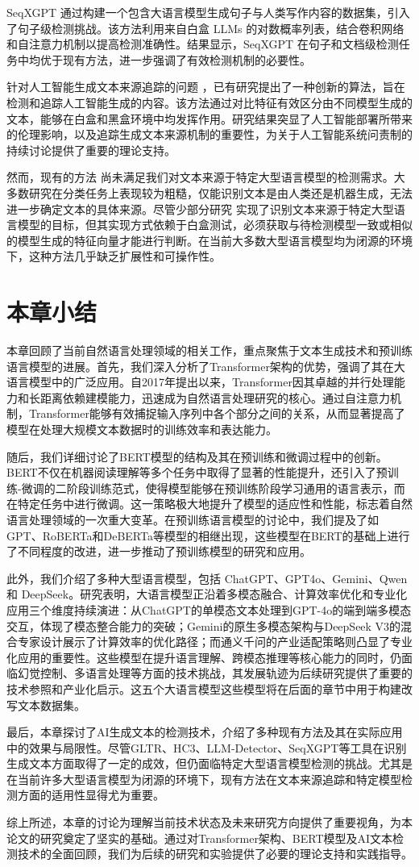 SeqXGPT \cite{wang_seqxgpt_2023} 通过构建一个包含大语言模型生成句子与人类写作内容的数据集，引入了句子级检测挑战。该方法利用来自白盒 LLMs 的对数概率列表，结合卷积网络和自注意力机制以提高检测准确性。结果显示，SeqXGPT 在句子和文档级检测任务中均优于现有方法，进一步强调了有效检测机制的必要性。

针对人工智能生成文本来源追踪的问题 \cite{li_origin_2023}，已有研究提出了一种创新的算法，旨在检测和追踪人工智能生成的内容。该方法通过对比特征有效区分由不同模型生成的文本，能够在白盒和黑盒环境中均发挥作用。研究结果突显了人工智能部署所带来的伦理影响，以及追踪生成文本来源机制的重要性，为关于人工智能系统问责制的持续讨论提供了重要的理论支持。

然而，现有的方法 \cite{gehrmann_gltr_2019, guo_how_2023, wang_llm-detector_2024, wang_seqxgpt_2023} 尚未满足我们对文本来源于特定大型语言模型的检测需求。大多数研究在分类任务上表现较为粗糙，仅能识别文本是由人类还是机器生成，无法进一步确定文本的具体来源。尽管少部分研究 \cite{li_origin_2023} 实现了识别文本来源于特定大型语言模型的目标，但其实现方式依赖于白盒测试，必须获取与待检测模型一致或相似的模型生成的特征向量才能进行判断。在当前大多数大型语言模型均为闭源的环境下，这种方法几乎缺乏扩展性和可操作性。

\section{本章小结}
\label{sec:rw-conclusion}

本章回顾了当前自然语言处理领域的相关工作，重点聚焦于文本生成技术和预训练语言模型的进展。首先，我们深入分析了Transformer架构的优势，强调了其在大语言模型中的广泛应用。自2017年提出以来，Transformer因其卓越的并行处理能力和长距离依赖建模能力，迅速成为自然语言处理研究的核心。通过自注意力机制，Transformer能够有效捕捉输入序列中各个部分之间的关系，从而显著提高了模型在处理大规模文本数据时的训练效率和表达能力。

随后，我们详细讨论了BERT模型的结构及其在预训练和微调过程中的创新。BERT不仅在机器阅读理解等多个任务中取得了显著的性能提升，还引入了预训练-微调的二阶段训练范式，使得模型能够在预训练阶段学习通用的语言表示，而在特定任务中进行微调。这一策略极大地提升了模型的适应性和性能，标志着自然语言处理领域的一次重大变革。在预训练语言模型的讨论中，我们提及了如GPT、RoBERTa和DeBERTa等模型的相继出现，这些模型在BERT的基础上进行了不同程度的改进，进一步推动了预训练模型的研究和应用。

此外，我们介绍了多种大型语言模型，包括 ChatGPT、GPT4o、Gemini、Qwen 和 DeepSeek。研究表明，大语言模型正沿着多模态融合、计算效率优化和专业化应用三个维度持续演进：从ChatGPT的单模态文本处理到GPT-4o的端到端多模态交互，体现了模态整合能力的突破；Gemini的原生多模态架构与DeepSeek V3的混合专家设计展示了计算效率的优化路径；而通义千问的产业适配策略则凸显了专业化应用的重要性。这些模型在提升语言理解、跨模态推理等核心能力的同时，仍面临幻觉控制、多语言处理等方面的技术挑战，其发展轨迹为后续研究提供了重要的技术参照和产业化启示。这五个大语言模型这些模型将在后面的章节中用于构建改写文本数据集。

最后，本章探讨了AI生成文本的检测技术，介绍了多种现有方法及其在实际应用中的效果与局限性。尽管GLTR、HC3、LLM-Detector、SeqXGPT等工具在识别生成文本方面取得了一定的成效，但仍面临特定大型语言模型检测的挑战。尤其是在当前许多大型语言模型为闭源的环境下，现有方法在文本来源追踪和特定模型检测方面的适用性显得尤为重要。

综上所述，本章的讨论为理解当前技术状态及未来研究方向提供了重要视角，为本论文的研究奠定了坚实的基础。通过对Transformer架构、BERT模型及AI文本检测技术的全面回顾，我们为后续的研究和实验提供了必要的理论支持和实践指导。